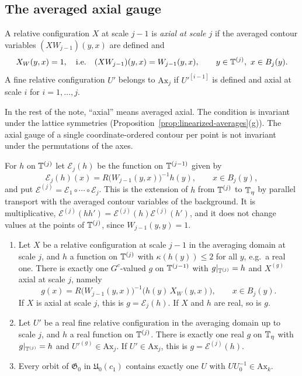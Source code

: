 \subsection{The averaged axial gauge}\label{ss:22.2}

\begin{definition}\label{def:axial}
A relative configuration $X$ at scale $j-1$ is \emph{axial at scale $j$} if the averaged contour variables $(XW_{j-1})(y,x)$ are defined and
\[
X_W(y,x)=1,\quad\text{i.e.}\quad(XW_{j-1})(y,x)=W_{j-1}(y,x),\qquad y\in\mathbb T^{(j)},\ x\in B_j(y).
\]
A fine relative configuration $U'$ belongs to $\mathrm{Ax}_j$ if $U'^{[i-1]}$ is defined and axial at scale $i$ for $i=1,\dots,j$.
\end{definition}

In the rest of the note, ``axial'' means averaged axial. The condition is invariant under the lattice symmetries (Proposition~\ref{prop:linearized-averages}(g)). The axial gauge of a single coordinate-ordered contour per point is not invariant under the permutations of the axes.

For $h$ on $\mathbb T^{(j)}$ let $\mathcal E_j(h)$ be the function on $\mathbb T^{(j-1)}$ given by
\[
\mathcal E_j(h)(x)=R\big(W_{j-1}(y,x)\big)^{-1}h(y),\qquad x\in B_j(y),
\]
and put $\mathcal E^{(j)}=\mathcal E_1\circ\cdots\circ\mathcal E_j$. This is the extension of $h$ from $\mathbb T^{(j)}$ to $\mathbb T_\eta$ by parallel transport with the averaged contour variables of the background. It is multiplicative, $\mathcal E^{(j)}(hh')=\mathcal E^{(j)}(h)\mathcal E^{(j)}(h')$, and it does not change values at the points of $\mathbb T^{(j)}$, since $W_{j-1}(y,y)=1$.

\begin{lemma}\label{lem:axial}
\begin{enumerate}[label=(\alph*)]
\item Let $X$ be a relative configuration at scale $j-1$ in the averaging domain at scale $j$, and $h$ a function on $\mathbb T^{(j)}$ with $\kappa(h(y))\le2$ for all $y$, e.g.\ a real one. There is exactly one $G^c$-valued $g$ on $\mathbb T^{(j-1)}$ with $g|_{\mathbb T^{(j)}}=h$ and $X^{(g)}$ axial at scale $j$, namely
\[
g(x)=R\big(W_{j-1}(y,x)\big)^{-1}\big(h(y)\,X_W(y,x)\big),\qquad x\in B_j(y).
\]
If $X$ is axial at scale $j$, this is $g=\mathcal E_j(h)$. If $X$ and $h$ are real, so is $g$.
\item Let $U'$ be a real fine relative configuration in the averaging domain up to scale $j$, and $h$ a real function on $\mathbb T^{(j)}$. There is exactly one real $g$ on $\mathbb T_\eta$ with $g|_{\mathbb T^{(j)}}=h$ and $U'^{(g)}\in\mathrm{Ax}_j$. If $U'\in\mathrm{Ax}_j$, this is $g=\mathcal E^{(j)}(h)$.
\item Every orbit of $\mathfrak G_0$ in $\mathfrak U_0(c_1)$ contains exactly one $U$ with $UU_0^{-1}\in\mathrm{Ax}_k$.
\end{enumerate}
\end{lemma}

